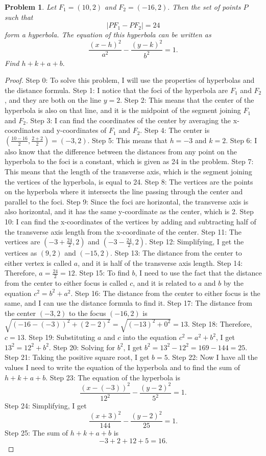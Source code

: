 \documentclass{article}
\newtheorem{theorem}{Problem}
\begin{document}
\begin{theorem}
Let $F_1 = (10,2)$ and $F_2 = (-16,2).$ Then the set of points $P$ such that \[|PF_1 - PF_2| = 24\] form a hyperbola. The equation of this hyperbola can be written as \[\frac{(x - h)^2}{a^2} - \frac{(y - k)^2}{b^2} = 1.\] Find $h + k + a + b.$
\end{theorem}

\begin{proof}
Step 0: To solve this problem, I will use the properties of hyperbolas and the distance formula.
Step 1: I notice that the foci of the hyperbola are $F_1$ and $F_2$, and they are both on the line $y = 2.$
Step 2: This means that the center of the hyperbola is also on that line, and it is the midpoint of the segment joining $F_1$ and $F_2.$
Step 3: I can find the coordinates of the center by averaging the x-coordinates and y-coordinates of $F_1$ and $F_2.$
Step 4: The center is $(\frac{10 - 16}{2}, \frac{2 + 2}{2}) = (-3, 2).$
Step 5: This means that $h = -3$ and $k = 2.$
Step 6: I also know that the difference between the distances from any point on the hyperbola to the foci is a constant, which is given as 24 in the problem.
Step 7: This means that the length of the transverse axis, which is the segment joining the vertices of the hyperbola, is equal to 24.
Step 8: The vertices are the points on the hyperbola where it intersects the line passing through the center and parallel to the foci.
Step 9: Since the foci are horizontal, the transverse axis is also horizontal, and it has the same y-coordinate as the center, which is 2.
Step 10: I can find the x-coordinates of the vertices by adding and subtracting half of the transverse axis length from the x-coordinate of the center.
Step 11: The vertices are $(-3 + \frac{24}{2}, 2)$ and $(-3 - \frac{24}{2}, 2).$
Step 12: Simplifying, I get the vertices as $(9, 2)$ and $(-15, 2).$
Step 13: The distance from the center to either vertex is called $a$, and it is half of the transverse axis length.
Step 14: Therefore, $a = \frac{24}{2} = 12.$
Step 15: To find $b$, I need to use the fact that the distance from the center to either focus is called $c$, and it is related to $a$ and $b$ by the equation $c^2 = b^2 + a^2.$
Step 16: The distance from the center to either focus is the same, and I can use the distance formula to find it.
Step 17: The distance from the center $(-3, 2)$ to the focus $(-16, 2)$ is $\sqrt{(-16 - (-3))^2 + (2 - 2)^2} = \sqrt{(-13)^2 + 0^2} = 13.$
Step 18: Therefore, $c = 13.$
Step 19: Substituting $a$ and $c$ into the equation $c^2 = a^2 + b^2$, I get $13^2 = 12^2 + b^2.$
Step 20: Solving for $b^2$, I get $b^2 = 13^2 - 12^2 = 169 - 144 = 25.$
Step 21: Taking the positive square root, I get $b = 5.$
Step 22: Now I have all the values I need to write the equation of the hyperbola and to find the sum of $h + k + a + b.$
Step 23: The equation of the hyperbola is\[ \frac{(x - (-3))^2}{12^2} - \frac{(y - 2)^2}{5^2} = 1.\]
Step 24: Simplifying, I get \[\frac{(x + 3)^2}{144} - \frac{(y - 2)^2}{25} = 1.\]
Step 25: The sum of $h + k + a + b$ is \[-3 + 2 + 12 + 5 = 16.\]
\end{proof}
\end{document}
